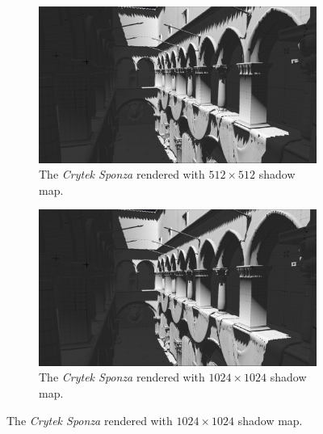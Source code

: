 \begin{figure}[t]
    \centering
    \begin{subfigure}{0.48\textwidth}
		\centering
        \includegraphics[width=\textwidth]{./graf/tests/basic/cropped/sponza_basic_fhd_512.png}
        \caption{The \textit{Crytek Sponza} rendered with \(512\times 512\) shadow map.}
    \end{subfigure}
	\hfill
    \begin{subfigure}{0.48\textwidth}
		\centering
        \includegraphics[width=\textwidth]{./graf/tests/basic/cropped/sponza_basic_fhd_1024.png}
        \caption{The \textit{\textit{Crytek Sponza}} rendered with \(1024\times 1024\) shadow map.}
    \end{subfigure}


\end{figure}
